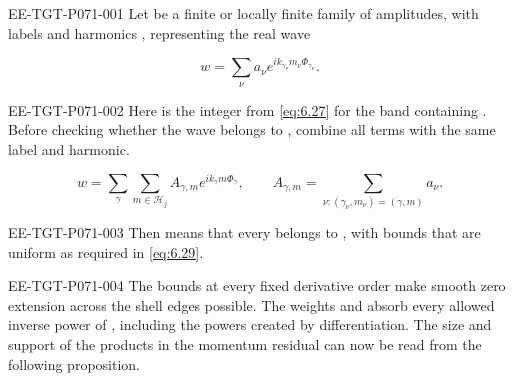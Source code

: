 %
\begin{EESegment}{EE-TGT-P071-001}
Let  be a finite or locally finite family of amplitudes, with labels  and harmonics , representing the real wave
\end{EESegment}
\[
  w=\sum_\nu a_\nu e^{ik_{\gamma_\nu}m_\nu\Phi_{\gamma_\nu}}.
\]
\begin{EESegment}{EE-TGT-P071-002}
Here  is the integer  from \eqref{eq:6.27} for the band containing . Before checking whether the wave belongs to , combine all terms with the same label and harmonic.
\end{EESegment}
\[
  w=\sum_\gamma\sum_{m\in\mathscr H_j}
    A_{\gamma,m}e^{ik_\gamma m\Phi_\gamma},
  \qquad
  A_{\gamma,m}=\sum_{\nu:(\gamma_\nu,m_\nu)=(\gamma,m)}a_\nu.
\]
\begin{EESegment}{EE-TGT-P071-003}
Then  means that every  belongs to , with bounds that are uniform as required in \eqref{eq:6.29}.
\end{EESegment}

\begin{EESegment}{EE-TGT-P071-004}
The bounds at every fixed derivative order make smooth zero extension across the shell edges possible. The weights  and  absorb every allowed inverse power of , including the powers created by differentiation. The size and support of the products in the momentum residual can now be read from the following proposition.
\end{EESegment}

